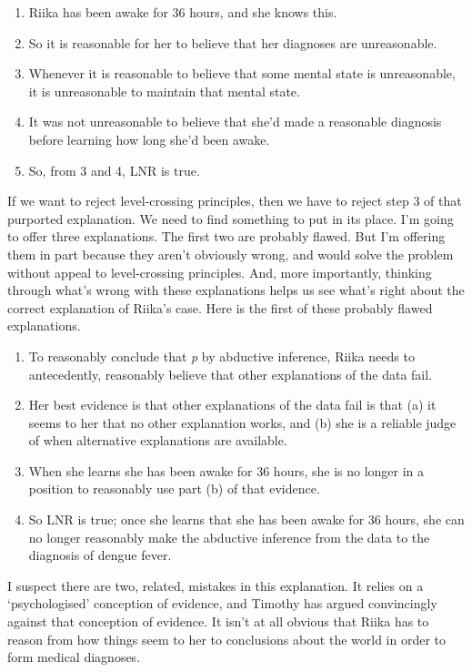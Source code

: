 \begin{enumerate}
\item{} \gls{Riika} has been awake for 36 hours, and she knows this.

\item{} So it is reasonable for her to believe that her diagnoses are unreasonable.

\item{} Whenever it is reasonable to believe that some mental state is unreasonable, it is unreasonable to maintain that mental state.

\item{} It was not unreasonable to believe that she'd made a reasonable diagnosis before learning how long she'd been awake.

\item{} So, from 3 and 4, LNR is true.

\end{enumerate}
If we want to reject level-crossing principles, then we have to reject step 3 of that purported explanation. We need to find something to put in its place. I'm going to offer three explanations. The first two are probably flawed. But I'm offering them in part because they aren't obviously wrong, and would solve the problem without appeal to level-crossing principles. And, more importantly, thinking through what's wrong with these explanations helps us see what's right about the correct explanation of \gls{Riika}'s case. Here is the first of these probably flawed explanations.

\begin{enumerate}
\item{} To reasonably conclude that \emph{p} by abductive inference, \gls{Riika} needs to antecedently, reasonably believe that other explanations of the data fail.

\item{} Her best evidence is that other explanations of the data fail is that (a) it seems to her that no other explanation works, and (b) she is a reliable judge of when alternative explanations are available.

\item{} When she learns she has been awake for 36 hours, she is no longer in a position to reasonably use part (b) of that evidence.

\item{} So LNR is true; once she learns that she has been awake for 36 hours, she can no longer reasonably make the abductive inference from the data to the diagnosis of dengue fever.

\end{enumerate}
I suspect there are two, related, mistakes in this explanation. It relies on a `psychologised' conception of evidence, and Timothy \citet{Williamson2007} has argued convincingly against that conception of evidence. It isn't at all obvious that \gls{Riika} has to reason from how things seem to her to conclusions about the world in order to form medical diagnoses.

